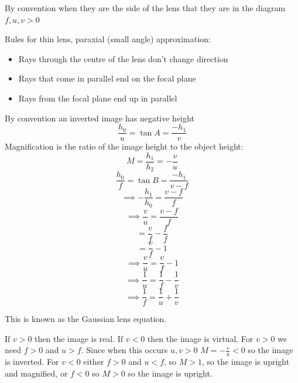 \documentclass{article}
\begin{document}
By convention when they are the side of the lens that they are in the diagram \(f,u,v>0\)

Rules for thin lens, paraxial (small angle) approximation:
\begin{itemize}
\item Rays through the centre of the lens don't change direction
\item Rays that come in parallel end on the focal plane
\item Rays from the focal plane end up in parallel
\end{itemize}

\begin{center}
\end{center}

By convention an inverted image has negative height
\[\frac{h_0}{u}=\tan A=\frac{-h_1}{v}\]
Magnification is the ratio of the image height to the object height:
\[M=\frac{h_1}{h_2}=-\frac vu\]
\[\frac{h_0}{f}=\tan B=\frac{-h_1}{v-f}\]
\[\implies-\frac{h_1}{h_0}=\frac{v-f}{f}\]
\[\implies\frac vu=\frac{v-f}{f}\]
\[=\frac vf-\frac ff\]
\[=\frac vf-1\]
\[\implies\frac vu=\frac vf-1\]
\[\implies\frac 1u=\frac 1f-\frac 1v\]
\[\implies\frac 1f=\frac 1u+\frac 1v\]

This is known as the Gaussian lens equation.

If \(v>0\) then the image is real. If \(v<0\) then the image is virtual. For \(v>0\) we need \(f>0\) and \(u>f\). Since when this occurs \(u,v>0\) \(M=-\frac vu<0\) so the image is inverted. For \(v<0\) either \(f>0\) and \(u<f\), so \(M>1\), so the image is upright and magnified, or \(f<0\) so \(M>0\) so the image is upright.
\end{document}
